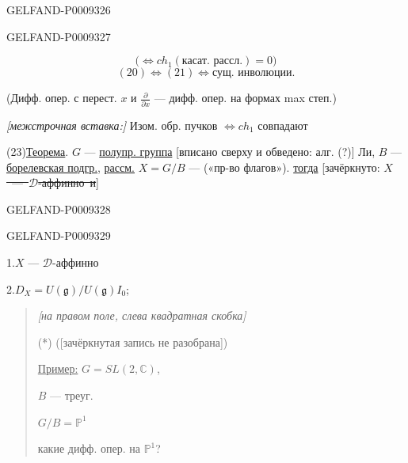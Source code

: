 \begin{GelfandAdjacentEvidence}{GELFAND-P000932}{6}

\end{GelfandAdjacentEvidence}
\begin{GelfandAdjacentEvidence}{GELFAND-P000932}{7}

\begin{equation*}
 \bigl(\Leftrightarrow ch_1(\text{касат. рассл.})=0\bigr)
 \tag{21}
\end{equation*}
\begin{equation*}
 (20)\Leftrightarrow(21)\Leftrightarrow\text{сущ. инволюции.}
 \tag{22}
\end{equation*}

(Дифф. опер. с перест. $x$ и $\frac{\partial}{\partial x}$ --- дифф. опер. на формах max степ.)

\textit{[межстрочная вставка:]} Изом. обр. пучков $\Leftrightarrow ch_1$ совпадают

(23)\quad \underline{Теорема}. $G$ --- \underline{полупр. группа} [вписано сверху и обведено: алг. (?)] Ли,
$B$ --- \underline{борелевская подгр.},
\underline{рассм.} $X=G/B$ --- («пр-во флагов»). \underline{тогда}
[зачёркнуто: \sout{\mbox{$X$ --- $\mathcal D$-аффинно и}}]
\end{GelfandAdjacentEvidence}
\begin{GelfandAdjacentEvidence}{GELFAND-P000932}{8}

\end{GelfandAdjacentEvidence}
\begin{GelfandAdjacentEvidence}{GELFAND-P000932}{9}


1.\enspace $X$ --- $\mathcal D$-аффинно

2.\enspace $D_X=U(\mathfrak g)/U(\mathfrak g)I_0$;

\begin{quote}
\textit{[на правом поле, слева квадратная скобка]}

(*) ([зачёркнутая запись не разобрана])

\underline{Пример:} $G=SL(2,\mathbb C)$,

$B$ --- треуг.

$G/B=\mathbb P^1$

какие дифф. опер. на $\mathbb P^1$?
\end{quote}
\end{GelfandAdjacentEvidence}
